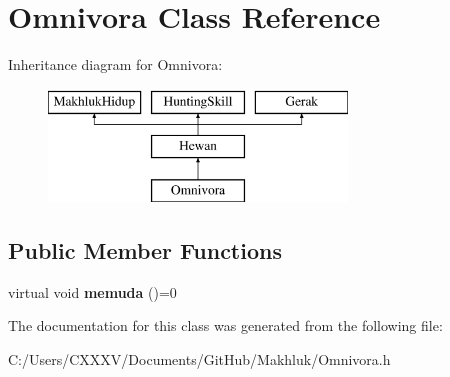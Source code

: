 \hypertarget{class_omnivora}{}\section{Omnivora Class Reference}
\label{class_omnivora}
Inheritance diagram for Omnivora\+:\begin{figure}[H]
\begin{center}
\leavevmode
\includegraphics[height=3.000000cm]{class_omnivora}
\end{center}
\end{figure}
\subsection*{Public Member Functions}
\begin{DoxyCompactItemize}
\item 
virtual void {\bfseries memuda} ()=0\hypertarget{class_omnivora_a811aacb0d623b6c0ecc4a2fe80179a8b}{}\label{class_omnivora_a811aacb0d623b6c0ecc4a2fe80179a8b}

\end{DoxyCompactItemize}


The documentation for this class was generated from the following file\+:\begin{DoxyCompactItemize}
\item 
C\+:/\+Users/\+C\+X\+X\+X\+V/\+Documents/\+Git\+Hub/\+Makhluk/Omnivora.\+h\end{DoxyCompactItemize}
